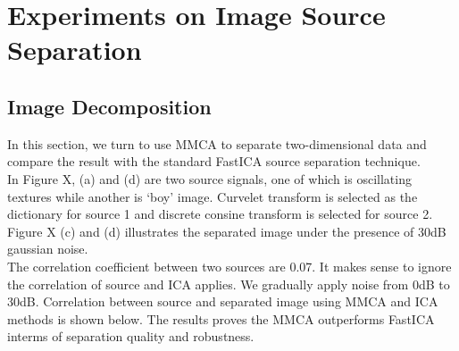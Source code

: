 \section{Experiments on Image Source Separation}

\subsection{Image Decomposition}

In this section, we turn to use MMCA to separate two-dimensional data and compare the result with the standard FastICA source separation technique. \\

In Figure X, (a) and (d) are two source signals, one of which is oscillating textures while another is `boy' image. Curvelet transform is selected as the dictionary for source 1 and discrete consine transform is selected for source 2. Figure X (c) and (d) illustrates the separated image under the presence of 30dB gaussian noise.\\

The correlation coefficient between two sources are 0.07. It makes sense to ignore the correlation of source and ICA applies. We gradually apply noise from 0dB to 30dB. Correlation between source and separated image using MMCA and ICA methods is shown below.
The results proves the MMCA outperforms FastICA interms of separation quality and robustness.\\

